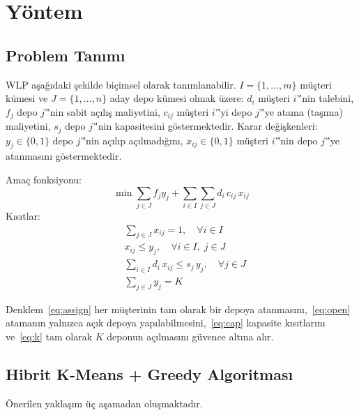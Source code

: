 \documentclass[conference]{IEEEtran}
\begin{document}
\section{Y\"{o}ntem}
\label{sec:method}

\subsection{Problem Tan{\i}m{\i}}

WLP a\c{s}a\u{g}{\i}daki \c{s}ekilde bi\c{c}imsel olarak tan{\i}mlanabilir.
$I = \{1,\ldots,m\}$ m\"{u}\c{s}teri k\"{u}mesi ve
$J = \{1,\ldots,n\}$ aday depo k\"{u}mesi olmak \"{u}zere:
$d_i$ m\"{u}\c{s}teri $i$'\''nin talebini,
$f_j$ depo $j$'\''nin sabit a\c{c}{\i}l{\i}\c{s} maliyetini,
$c_{ij}$ m\"{u}\c{s}teri $i$'\''yi depo $j$'\''ye atama (ta\c{s}{\i}ma)
maliyetini,
$s_j$ depo $j$'\''nin kapasitesini g\"{o}stermektedir.
Karar de\u{g}i\c{s}kenleri:
$y_j \in \{0,1\}$ depo $j$'\''nin a\c{c}{\i}l{\i}p a\c{c}{\i}lmad{\i}\u{g}{\i}n{\i},
$x_{ij} \in \{0,1\}$ m\"{u}\c{s}teri $i$'\''nin depo $j$'\''ye
atanmas{\i}n{\i} g\"{o}stermektedir.

Ama\c{c} fonksiyonu:
\begin{equation}
  \min \sum_{j \in J} f_j y_j +
       \sum_{i \in I}\sum_{j \in J} d_i\, c_{ij}\, x_{ij}
  \label{eq:obj}
\end{equation}
K{\i}s{\i}tlar:
\begin{align}
  &\sum_{j \in J} x_{ij} = 1, \quad \forall i \in I
  \label{eq:assign}\\
  &x_{ij} \leq y_j, \quad \forall i \in I,\; j \in J
  \label{eq:open}\\
  &\sum_{i \in I} d_i\, x_{ij} \leq s_j\, y_j, \quad \forall j \in J
  \label{eq:cap}\\
  &\sum_{j \in J} y_j = K
  \label{eq:k}
\end{align}

Denklem~\eqref{eq:assign} her m\"{u}\c{s}terinin tam olarak bir depoya
atanmas{\i}n{\i},~\eqref{eq:open} ataman{\i}n yaln{\i}zca a\c{c}{\i}k
depoya yap{\i}labilmesini,~\eqref{eq:cap} kapasite k{\i}s{\i}tlar{\i}n{\i}
ve~\eqref{eq:k} tam olarak $K$ deponun a\c{c}{\i}lmas{\i}n{\i}
g\"{u}vence alt{\i}na al{\i}r.

\subsection{Hibrit K-Means + Greedy Algoritmas{\i}}

\"{O}nerilen yakla\c{s}{\i}m \"{u}\c{c} a\c{s}amadan olu\c{s}maktad{\i}r.
\end{document}
